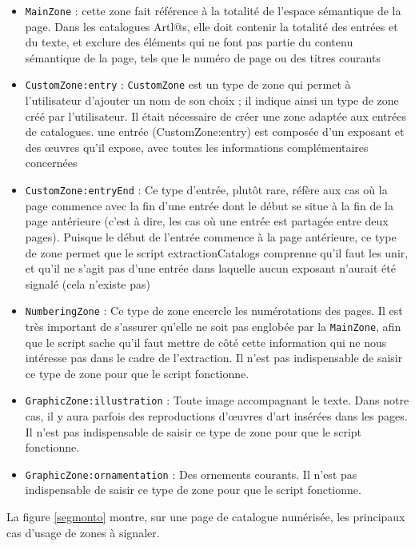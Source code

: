\documentclass[a4paper,12pt,twoside]{book}
\begin{document}
\begin{itemize}
	\item \texttt{MainZone} : cette zone fait référence à la totalité de l'espace sémantique de la page. Dans les catalogues Artl@s, elle doit contenir la totalité des entrées et du texte, et exclure des éléments qui ne font pas partie du contenu sémantique de la page,  tels que le numéro de page ou des titres courants
	\item \texttt{CustomZone:entry} : \texttt{CustomZone} est un type de zone qui permet à l'utilisateur d'ajouter un nom de son choix ; il indique ainsi un type de zone créé par l'utilisateur. Il était nécessaire de créer une zone adaptée aux entrées de catalogues. une entrée (CustomZone:entry) est composée d'un exposant et des œuvres qu'il expose, avec toutes les informations complémentaires concernées
	\item \texttt{CustomZone:entryEnd} : Ce type d'entrée, plutôt rare, réfère aux cas où la page commence avec la fin d'une entrée dont le début se situe à la fin de la page antérieure (c'est à dire, les cas où une entrée est partagée entre deux pages). Puisque le début de l'entrée commence à la page antérieure, ce type de zone permet que le script extractionCatalogs comprenne qu'il faut les unir, et qu'il ne s'agit pas d'une entrée dans laquelle aucun exposant n'aurait été signalé (cela n'existe pas)
	\item \texttt{NumberingZone} : Ce type de zone encercle les numérotations des pages. Il est très important de s'assurer qu'elle ne soit pas englobée par la \texttt{MainZone}, afin que le script sache qu'il faut mettre de côté cette information qui ne nous intéresse pas dans le cadre de l'extraction. Il n'est pas indispensable de saisir ce type de zone pour que le script fonctionne.
	\item \texttt{GraphicZone:illustration} : Toute image accompagnant le texte. Dans notre cas, il y aura parfois des reproductions d'œuvres d'art insérées dans les pages. Il n'est pas indispensable de saisir ce type de zone pour que le script fonctionne. 
	\item \texttt{GraphicZone:ornamentation} : Des ornements courants. Il n'est pas indispensable de saisir ce type de zone pour que le script fonctionne.
\end{itemize}

La figure \ref{segmonto} montre, sur une page de catalogue numérisée, les principaux cas d'usage de zones à signaler. 
\end{document}
